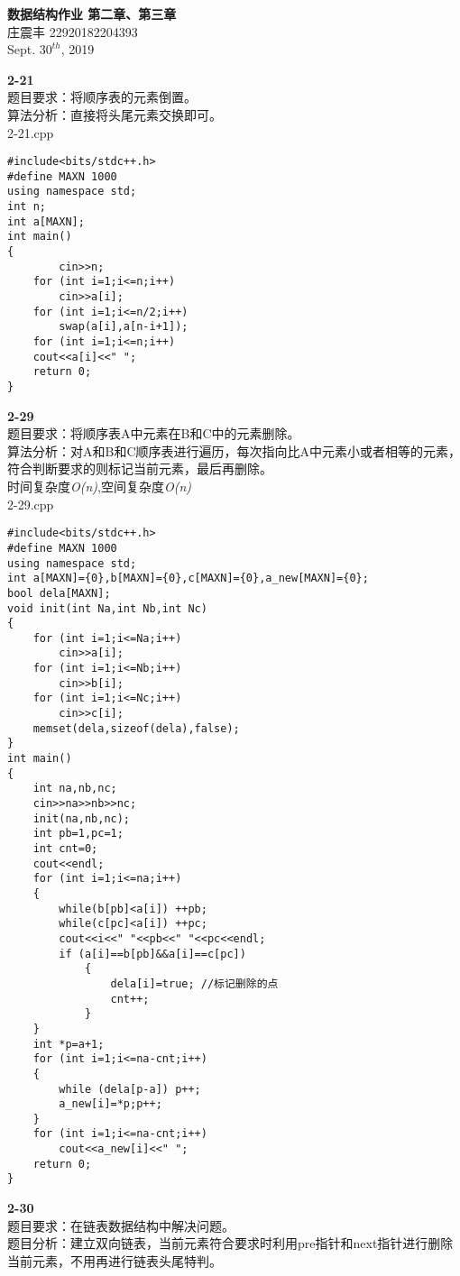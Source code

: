 \documentclass[UTF8,a4paper]{article}
\begin{document}
\begin{center}
    \textbf{\LARGE{数据结构作业 第二章、第三章}}\\[0.5cm]
    \normalsize{庄震丰 22920182204393}\\[0.3cm]
    \large{Sept. $30^{th}$, 2019}
\end{center}
\textbf{2-21}\\
    题目要求：将顺序表的元素倒置。\\
    算法分析：直接将头尾元素交换即可。\\
    2-21.cpp
\begin{lstlisting}
#include<bits/stdc++.h>
#define MAXN 1000
using namespace std;
int n;
int a[MAXN];
int main()
{
        cin>>n;
    for (int i=1;i<=n;i++)
        cin>>a[i];
    for (int i=1;i<=n/2;i++)
        swap(a[i],a[n-i+1]);
    for (int i=1;i<=n;i++)
    cout<<a[i]<<" ";
    return 0;
}
\end{lstlisting}
\textbf{2-29}\\
    题目要求：将顺序表A中元素在B和C中的元素删除。\\
    算法分析：对A和B和C顺序表进行遍历，每次指向比A中元素小或者相等的元素，符合判断要求的则标记当前元素，最后再删除。\\
    时间复杂度\textit{O(n)},空间复杂度\textit{O(n)}\\
    2-29.cpp
\begin{lstlisting}
#include<bits/stdc++.h>
#define MAXN 1000
using namespace std;
int a[MAXN]={0},b[MAXN]={0},c[MAXN]={0},a_new[MAXN]={0};
bool dela[MAXN];
void init(int Na,int Nb,int Nc)
{
    for (int i=1;i<=Na;i++)
        cin>>a[i];
    for (int i=1;i<=Nb;i++)
        cin>>b[i];
    for (int i=1;i<=Nc;i++)
        cin>>c[i];
    memset(dela,sizeof(dela),false);
}
int main()
{
    int na,nb,nc;
    cin>>na>>nb>>nc;
    init(na,nb,nc);
    int pb=1,pc=1;
    int cnt=0;
    cout<<endl;
    for (int i=1;i<=na;i++)
    {
        while(b[pb]<a[i]) ++pb;
        while(c[pc]<a[i]) ++pc;
        cout<<i<<" "<<pb<<" "<<pc<<endl;
        if (a[i]==b[pb]&&a[i]==c[pc]) 
            {
                dela[i]=true; //标记删除的点
                cnt++;
            }
    }
    int *p=a+1;
    for (int i=1;i<=na-cnt;i++)
    {
        while (dela[p-a]) p++; 
        a_new[i]=*p;p++;
    }
    for (int i=1;i<=na-cnt;i++)
        cout<<a_new[i]<<" ";
    return 0;
}
\end{lstlisting}
\textbf{2-30}\\
题目要求：在链表数据结构中解决问题。\\
题目分析：建立双向链表，当前元素符合要求时利用pre指针和next指针进行删除当前元素，不用再进行链表头尾特判。\\
\end{document}
